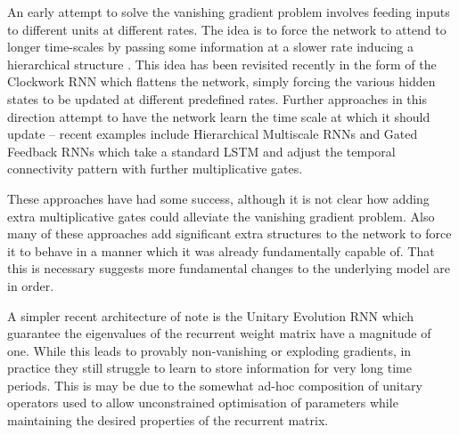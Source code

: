 An early attempt to solve the vanishing gradient problem involves feeding inputs to different units
at different
rates. The idea is to force the network to attend to longer
time-scales by passing some information at a slower rate inducing a hierarchical structure
 \autocite{Hihi1995}. 
This idea has been revisited recently in
the form of the Clockwork RNN \autocite{Koutnik2014} which flattens the network, simply forcing
the various hidden states to be updated at different predefined rates. Further approaches in this
direction attempt to have the network learn the time scale at which it should update -- recent
examples include Hierarchical Multiscale RNNs \autocite{Chung2016} and Gated Feedback RNNs
\autocite{Chung2015} which take a standard LSTM and adjust the temporal connectivity pattern
with further multiplicative gates.

These approaches have had some success, although it is not clear how adding extra
multiplicative gates could alleviate the vanishing gradient problem. Also many of these
approaches add significant extra structures to the network
to force it to behave in a manner which
it was already fundamentally capable of. 
That this is necessary suggests more fundamental changes to the underlying model are in order.

%

A simpler recent architecture of note is the Unitary Evolution RNN
\autocite{Arjovsky2015} which guarantee the eigenvalues of the recurrent weight matrix have a
magnitude of one. While this leads to provably non-vanishing or exploding gradients, in
practice they still struggle to learn to store information for very long time periods.
This is may be due to the somewhat ad-hoc composition of unitary operators used to allow
unconstrained optimisation of parameters while maintaining the desired properties of the
recurrent matrix.

